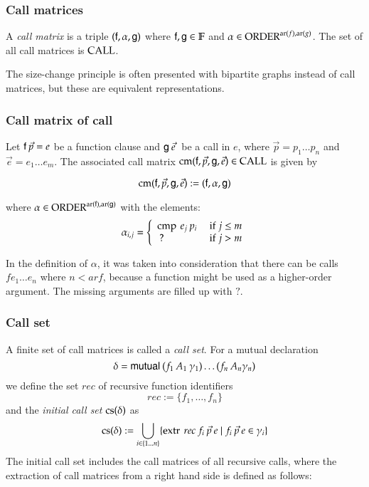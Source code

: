 \newcommand{\call}{\opn{CALL}}
\newcommand{\cm}{\opn{cm}}
\newcommand{\cs}{\opn{cs}}
\newcommand{\complete}{\opn{complete}}

\subsubsection{Call matrices}
A \emph{call matrix} is a triple $(\mathsf{f},\alpha,\mathsf{g})$ where $\mathsf{f},\mathsf{g} \in \mathbb{F}$ and $\alpha \in \operatorname{ORDER}^{\operatorname{ar}(f),\operatorname{ar}(g)}$.
The set of all call matrices is $\call$.

The size-change principle is often presented with bipartite graphs instead of call matrices, but these are
equivalent representations.


\subsubsection{Call matrix of call}
Let $\mathsf{f} \: \vec{p} = e$ be a function clause and $\mathsf{g} \: \vec{e}\:$ be a call in $e$,
where $\vec{p} = p_1 \ldots p_n$ and $\vec{e} = e_1 \ldots e_m$.
The associated call matrix $\cm(\ff,\vec{p},\fg,\vec{e}) \in \call $ is given by 

\[\cm(\ff,\vec{p},\fg,\vec{e}) := (\ff,\alpha,\fg) \]


where $\alpha \in \operatorname{ORDER}^{\operatorname{ar}(\mathsf{f}),\operatorname{ar}(\mathsf{g})} $ with the elements:
\[ 
\alpha_{i,j} = \left\{ \begin{array}{ll}
    \operatorname{cmp} \: e_j \: p_i & \mbox{ if } j \leq m \\
    \: ?  & \mbox{ if } j > m
 \end{array}\right.
\]

    
In the definition of $\alpha$, it was taken into consideration that there can be calls $f e_1 \ldots e_n$ where $n < ar f$, because a function might be used as a higher-order argument. The missing arguments are filled up with $?$. 

\subsubsection{Call set}
A finite set of call matrices is called a \emph{call set}.
For a mutual declaration 
\[ \delta = \mathsf{mutual}\: (f_1 \: A_1 \: \gamma_1) \ldots (f_n \: A_n \gamma_n) \] 
we define the set $rec$ of recursive function identifiers
\[ rec := \{ f_1 , \ldots , f_n \} \]
and the \emph{initial call set} $\cs(\delta)$ as
\[ \cs(\delta) := \bigcup_{i \in \{1 \ldots n\}} \{ \extr \: rec \: f_i \: \vec{p} \: e \mid f_i \: \vec{p} \: e \in \gamma_i  \} \] 
The initial call set includes the call matrices of all recursive calls, where the extraction of call matrices from a right hand side is defined as follows:
